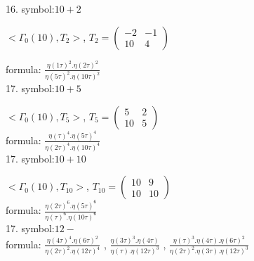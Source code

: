 

16. symbol:$ 10+2 $

$ < \Gamma_0 ( 10 ), T_2 >  $,
$
T_2 = 
\left(
\begin{array}{cc}
-2 & -1 \\
10 & 4
\end{array}
\right)
$

formula: 
$ \frac{\eta(1\tau)^2 . \eta(2\tau)^2}{\eta(5\tau)^2 . \eta(10\tau)^2} $
\\

17. symbol:$ 10+5 $

$ < \Gamma_0 ( 10 ), T_5 >  $,
$
T_5 = 
\left(
\begin{array}{cc}
5 & 2 \\
10 & 5
\end{array}
\right)
$
\\

formula: 
$ \frac{\eta(\tau)^4 . \eta(5\tau)^4}{\eta(2\tau)^4 . \eta(10\tau)^4} $
\\

17. symbol:$ 10+10 $

$ < \Gamma_0 ( 10 ), T_{10} >  $,
$
T_{10} = 
\left(
\begin{array}{cc}
10 & 9 \\
10 & 10
\end{array}
\right)
$
\\

formula: 
$ \frac{\eta(2\tau)^6 . \eta(5\tau)^6}{\eta(\tau)^6 . \eta(10\tau)^6} $
\\

17. symbol:$ 12- $
\\

formula: 
$ \frac{\eta(4\tau)^4 . \eta(6\tau)^2}{\eta(2\tau)^2 . \eta(12\tau)^4} $
, 
$ \frac{\eta(3\tau)^3 . \eta(4\tau)}{\eta(\tau) . \eta(12\tau)^3} $
, 
$ \frac{\eta(\tau)^3 . \eta(4\tau).\eta(6\tau)^2}{\eta(2\tau)^2 .\eta(3\tau). \eta(12\tau)^3} $

\\